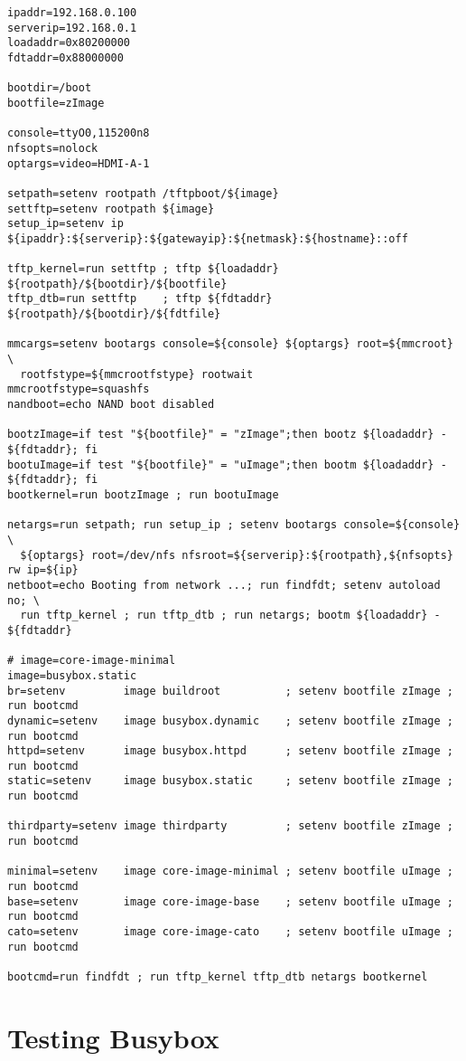 \begin{verbatim}
ipaddr=192.168.0.100
serverip=192.168.0.1
loadaddr=0x80200000
fdtaddr=0x88000000

bootdir=/boot
bootfile=zImage

console=ttyO0,115200n8
nfsopts=nolock
optargs=video=HDMI-A-1

setpath=setenv rootpath /tftpboot/${image}
settftp=setenv rootpath ${image}
setup_ip=setenv ip ${ipaddr}:${serverip}:${gatewayip}:${netmask}:${hostname}::off

tftp_kernel=run settftp ; tftp ${loadaddr} ${rootpath}/${bootdir}/${bootfile}
tftp_dtb=run settftp    ; tftp ${fdtaddr}  ${rootpath}/${bootdir}/${fdtfile}

mmcargs=setenv bootargs console=${console} ${optargs} root=${mmcroot}   \
  rootfstype=${mmcrootfstype} rootwait
mmcrootfstype=squashfs
nandboot=echo NAND boot disabled

bootzImage=if test "${bootfile}" = "zImage";then bootz ${loadaddr} - ${fdtaddr}; fi
bootuImage=if test "${bootfile}" = "uImage";then bootm ${loadaddr} - ${fdtaddr}; fi
bootkernel=run bootzImage ; run bootuImage

netargs=run setpath; run setup_ip ; setenv bootargs console=${console} \
  ${optargs} root=/dev/nfs nfsroot=${serverip}:${rootpath},${nfsopts} rw ip=${ip}
netboot=echo Booting from network ...; run findfdt; setenv autoload no; \
  run tftp_kernel ; run tftp_dtb ; run netargs; bootm ${loadaddr} - ${fdtaddr}

# image=core-image-minimal
image=busybox.static
br=setenv         image buildroot          ; setenv bootfile zImage ; run bootcmd
dynamic=setenv    image busybox.dynamic    ; setenv bootfile zImage ; run bootcmd
httpd=setenv      image busybox.httpd      ; setenv bootfile zImage ; run bootcmd
static=setenv     image busybox.static     ; setenv bootfile zImage ; run bootcmd

thirdparty=setenv image thirdparty         ; setenv bootfile zImage ; run bootcmd

minimal=setenv    image core-image-minimal ; setenv bootfile uImage ; run bootcmd
base=setenv       image core-image-base    ; setenv bootfile uImage ; run bootcmd
cato=setenv       image core-image-cato    ; setenv bootfile uImage ; run bootcmd

bootcmd=run findfdt ; run tftp_kernel tftp_dtb netargs bootkernel
\end{verbatim}

\section{Testing Busybox}

